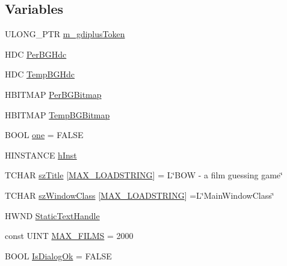 \subsection*{Variables}
\begin{DoxyCompactItemize}
\item 
U\+L\+O\+N\+G\+\_\+\+P\+T\+R \hyperlink{_b_o_w-a_01film_01guessing_01game_8cpp_af12b122c239334cdcd9d6922bad12862}{m\+\_\+gdiplus\+Token}
\item 
H\+D\+C \hyperlink{_b_o_w-a_01film_01guessing_01game_8cpp_a73a3f758934f64a1cc96332c726e31e5}{Per\+B\+G\+Hdc}
\item 
H\+D\+C \hyperlink{_b_o_w-a_01film_01guessing_01game_8cpp_a4be9a5a1cac801777358d2c0e3f90830}{Temp\+B\+G\+Hdc}
\item 
H\+B\+I\+T\+M\+A\+P \hyperlink{_b_o_w-a_01film_01guessing_01game_8cpp_a8a80a55aa6b2fc79b377b94981b09c07}{Per\+B\+G\+Bitmap}
\item 
H\+B\+I\+T\+M\+A\+P \hyperlink{_b_o_w-a_01film_01guessing_01game_8cpp_a4df24c9cd183e9df90e2fc5a09e54aa6}{Temp\+B\+G\+Bitmap}
\item 
B\+O\+O\+L \hyperlink{_b_o_w-a_01film_01guessing_01game_8cpp_a7c08b194baed7ff0320a51a91d26fe3a}{one} = F\+A\+L\+S\+E
\item 
H\+I\+N\+S\+T\+A\+N\+C\+E \hyperlink{_b_o_w-a_01film_01guessing_01game_8cpp_a44f41244c97693b2fbd5244bcb1e86ec}{h\+Inst}
\item 
T\+C\+H\+A\+R \hyperlink{_b_o_w-a_01film_01guessing_01game_8cpp_a0255997040d96a52f933b0c0d4bd8e01}{sz\+Title} \mbox{[}\hyperlink{_b_o_w-a_01film_01guessing_01game_8cpp_a2b68559d692760680c326428841254d1}{M\+A\+X\+\_\+\+L\+O\+A\+D\+S\+T\+R\+I\+N\+G}\mbox{]} = L\char`\"{}B\+O\+W -\/ a film guessing game\char`\"{}
\item 
T\+C\+H\+A\+R \hyperlink{_b_o_w-a_01film_01guessing_01game_8cpp_ac428b0bb455914397f2929cc9a3eb9e4}{sz\+Window\+Class} \mbox{[}\hyperlink{_b_o_w-a_01film_01guessing_01game_8cpp_a2b68559d692760680c326428841254d1}{M\+A\+X\+\_\+\+L\+O\+A\+D\+S\+T\+R\+I\+N\+G}\mbox{]} =L\char`\"{}Main\+Window\+Class\char`\"{}
\item 
H\+W\+N\+D \hyperlink{_b_o_w-a_01film_01guessing_01game_8cpp_ad475b56f2055d00b3c693f6560c10e8e}{Static\+Text\+Handle}
\item 
const U\+I\+N\+T \hyperlink{_b_o_w-a_01film_01guessing_01game_8cpp_aa31048f49d109f6551271267f3470d11}{M\+A\+X\+\_\+\+F\+I\+L\+M\+S} = 2000
\item 
B\+O\+O\+L \hyperlink{_b_o_w-a_01film_01guessing_01game_8cpp_ab4773708eb66f5571e5be7c1ca60e18f}{Is\+Dialog\+Ok} = F\+A\+L\+S\+E

\end{DoxyCompactItemize}
